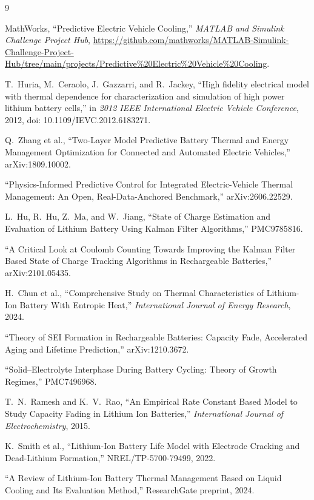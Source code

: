 \documentclass[10pt,conference]{IEEEtran}
\begin{document}
\begin{thebibliography}{9}

MathWorks, ``Predictive Electric Vehicle Cooling,'' \emph{MATLAB and Simulink Challenge Project Hub}, \url{https://github.com/mathworks/MATLAB-Simulink-Challenge-Project-Hub/tree/main/projects/Predictive\%20Electric\%20Vehicle\%20Cooling}.

T.~Huria, M.~Ceraolo, J.~Gazzarri, and R.~Jackey, ``High fidelity electrical model with thermal dependence for characterization and simulation of high power lithium battery cells,'' in \emph{2012 IEEE International Electric Vehicle Conference}, 2012, doi: 10.1109/IEVC.2012.6183271.

Q.~Zhang et al., ``Two-Layer Model Predictive Battery Thermal and Energy Management Optimization for Connected and Automated Electric Vehicles,'' arXiv:1809.10002.

``Physics-Informed Predictive Control for Integrated Electric-Vehicle Thermal Management: An Open, Real-Data-Anchored Benchmark,'' arXiv:2606.22529.

L.~Hu, R.~Hu, Z.~Ma, and W.~Jiang, ``State of Charge Estimation and Evaluation of Lithium Battery Using Kalman Filter Algorithms,'' PMC9785816.

``A Critical Look at Coulomb Counting Towards Improving the Kalman Filter Based State of Charge Tracking Algorithms in Rechargeable Batteries,'' arXiv:2101.05435.

H.~Chun et al., ``Comprehensive Study on Thermal Characteristics of Lithium-Ion Battery With Entropic Heat,'' \emph{International Journal of Energy Research}, 2024.

``Theory of SEI Formation in Rechargeable Batteries: Capacity Fade, Accelerated Aging and Lifetime Prediction,'' arXiv:1210.3672.

``Solid--Electrolyte Interphase During Battery Cycling: Theory of Growth Regimes,'' PMC7496968.

T.~N.~Ramesh and K.~V.~Rao, ``An Empirical Rate Constant Based Model to Study Capacity Fading in Lithium Ion Batteries,'' \emph{International Journal of Electrochemistry}, 2015.

K.~Smith et al., ``Lithium-Ion Battery Life Model with Electrode Cracking and Dead-Lithium Formation,'' NREL/TP-5700-79499, 2022.

``A Review of Lithium-Ion Battery Thermal Management Based on Liquid Cooling and Its Evaluation Method,'' ResearchGate preprint, 2024.

\end{thebibliography}
\end{document}

